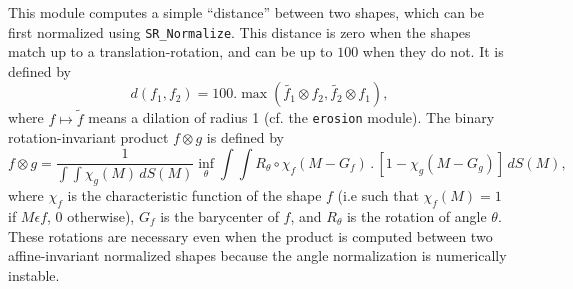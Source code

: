 This module computes a simple ``distance'' between two shapes, which can be
first normalized using \verb+SR_Normalize+. This distance is zero when the 
shapes match up to a translation-rotation, and can be up to $100$ when they 
do not. It is defined by
$$d(f_1,f_2) = 100. \max (\tilde{f_1} \otimes f_2,\tilde{f_2} \otimes f_1 ),$$
where $f \mapsto \tilde{f}$ means a dilation of radius 1 (cf. the
\verb+erosion+ module). The binary rotation-invariant product $f \otimes g$ 
is defined by
$$f \otimes g = \frac{1}{\int\!\!\int \chi_g(M) \, dS(M)} \inf_{\theta} \int\!\!\int R_{\theta} \circ \chi_f (M-G_f) \,.\, \left[ 1 - \chi_g(M-G_g) \right]
 \, dS(M),$$
where $\chi_f$ is the characteristic function of the shape $f$ (i.e such
that $\chi_f(M) = 1$ if $M \epsilon f$, $0$ otherwise), $G_f$ is the
barycenter of $f$, and $R_{\theta}$ is the rotation of angle $\theta$.
These rotations are necessary even when the product is computed between
two affine-invariant normalized shapes because the angle normalization 
is numerically instable.
